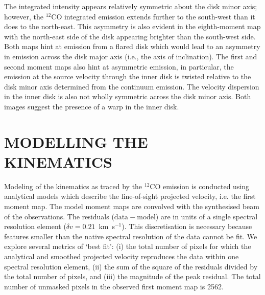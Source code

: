 \documentclass[onecolumn]{aastex6}
\newcommand{\kms}{km~s$^{-1}$}
\newcommand{\perbeam}{beam$^{-1}$}
\begin{document}
The integrated intensity appears relatively symmetric about the
disk minor axis; however, the $^{12}$CO integrated emission extends
further to the south-west than it does to the north-east.
This asymmetry is also evident in the eighth-moment map with the
north-east side of the disk appearing brighter than the south-west side.
Both maps hint at emission from a flared disk which would lead to an
asymmetry in emission across the disk major axis (i.e., the axis of inclination).
The first and second moment maps also hint at asymmetric emission, in particular,
the emission at the source velocity through the inner disk is twisted relative to the
disk minor axis determined from the continuum emission.
The velocity dispersion in the inner disk is also not wholly symmetric across
the disk minor axis.
Both images suggest the presence of a warp in the inner disk.


\section{MODELLING THE KINEMATICS}
\label{modelkinematics}

Modeling of the kinematics as traced by the $^{12}$CO emission is conducted
using analytical models which describe the line-of-sight projected velocity,
i.e. the first moment map.
The model moment maps are convolved with the synthesised beam of the observations.
The residuals ($\mathrm{data} - \mathrm{model}$) are in units of a single spectral
resolution element ($\delta v = 0.21$~\kms).
This discretisation is necessary because features smaller than the native spectral
resolution of the data cannot be fit.
We explore several metrics of `best fit':
(i) the total number of pixels for which the analytical and smoothed
projected velocity reproduces the data within one spectral resolution element,
(ii) the sum of the square of the residuals divided by the total number of pixels, and
(iii) the magnitude of the peak residual.
The total number of unmasked pixels in the observed first moment map is 2562.
\end{document}
